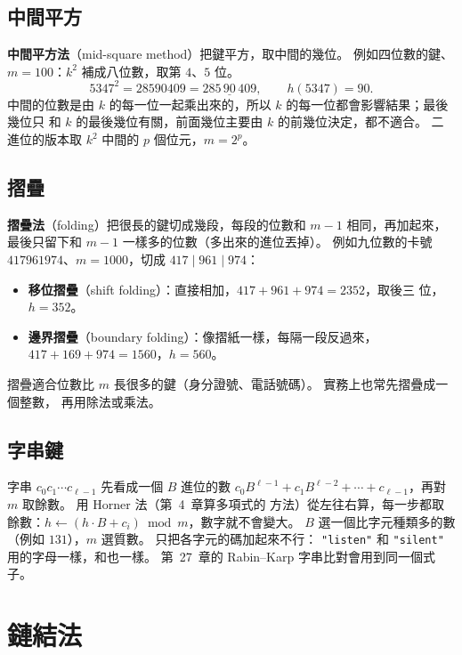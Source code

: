 \subsection{中間平方}

\textbf{中間平方法}（mid-square method）把鍵平方，取中間的幾位。 例如四位數的鍵、
$m = 100$：$k^2$ 補成八位數，取第 $4$、$5$ 位。
\[
5347^2 = 28590409 = 285\,\underline{90}\,409, \qquad h(5347) = 90.
\]
中間的位數是由 $k$ 的每一位一起乘出來的，所以 $k$ 的每一位都會影響結果；最後幾位只
和 $k$ 的最後幾位有關，前面幾位主要由 $k$ 的前幾位決定，都不適合。 二進位的版本取
$k^2$ 中間的 $p$ 個位元，$m = 2^p$。

\subsection{摺疊}

\textbf{摺疊法}（folding）把很長的鍵切成幾段，每段的位數和 $m - 1$ 相同，再加起來，
最後只留下和 $m - 1$ 一樣多的位數（多出來的進位丟掉）。 例如九位數的卡號
$417961974$、$m = 1000$，切成 $417 \mid 961 \mid 974$：

\begin{itemize}
\item \textbf{移位摺疊}（shift folding）：直接相加，$417 + 961 + 974 = 2352$，取後三
位，$h = 352$。
\item \textbf{邊界摺疊}（boundary folding）：像摺紙一樣，每隔一段反過來，
$417 + 169 + 974 = 1560$，$h = 560$。
\end{itemize}

摺疊適合位數比 $m$ 長很多的鍵（身分證號、電話號碼）。 實務上也常先摺疊成一個整數，
再用除法或乘法。

\subsection{字串鍵}

字串 $c_0 c_1 \cdots c_{\ell-1}$ 先看成一個 $B$ 進位的數 $c_0 B^{\ell-1} + c_1
B^{\ell-2} + \cdots + c_{\ell-1}$，再對 $m$ 取餘數。 用 Horner 法（第~4~章算多項式的
方法）從左往右算，每一步都取餘數：$h \gets (h \cdot B + c_i) \bmod m$，數字就不會變大。
$B$ 選一個比字元種類多的數（例如 $131$），$m$ 選質數。 只把各字元的碼加起來不行：
\texttt{"listen"} 和 \texttt{"silent"} 用的字母一樣，和也一樣。 第~27~章的
Rabin--Karp 字串比對會用到同一個式子。

\section{鏈結法}
\label{sec:hash-chain}

